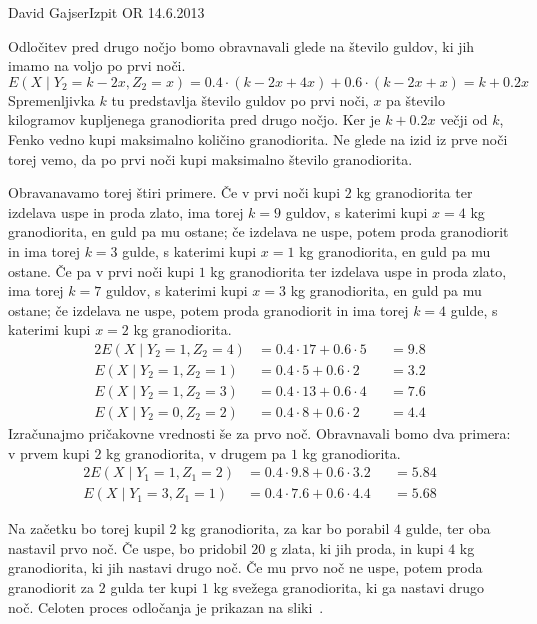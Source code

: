 \begin{naloga}{David Gajser}{Izpit OR 14.6.2013}
\begin{odgovor}
Odločitev pred drugo nočjo bomo obravnavali glede na število guldov,
ki jih imamo na voljo po prvi noči.
$$
E(X \mid  Y_2 = k-2x, Z_2 = x) = 0.4 \cdot (k - 2x + 4x) + 0.6 \cdot (k - 2x + x) = k + 0.2x
$$
Spremenljivka $k$ tu predstavlja število guldov po prvi noči,
$x$ pa število kilogramov kupljenega granodiorita pred drugo nočjo.
Ker je $k + 0.2x$ večji od $k$,
Fenko vedno kupi maksimalno količino granodiorita.
Ne glede na izid iz prve noči torej vemo,
da po prvi noči kupi maksimalno število granodiorita.

Obravanavamo torej štiri primere.
Če v prvi noči kupi $2$ kg granodiorita ter izdelava uspe in proda zlato,
ima torej $k = 9$ guldov, s katerimi kupi $x = 4$ kg granodiorita,
en guld pa mu ostane;
če izdelava ne uspe, potem proda granodiorit in ima torej $k = 3$ gulde,
s katerimi kupi $x = 1$ kg granodiorita, en guld pa mu ostane.
Če pa v prvi noči kupi $1$ kg granodiorita ter izdelava uspe in proda zlato,
ima torej $k = 7$ guldov, s katerimi kupi $x = 3$ kg granodiorita,
en guld pa mu ostane;
če izdelava ne uspe, potem proda granodiorit in ima torej $k = 4$ gulde,
s katerimi kupi $x = 2$ kg granodiorita.
\begin{alignat*}{2}
E(X \mid  Y_2 = 1, Z_2 = 4) &= 0.4 \cdot 17 + 0.6 \cdot 5 &&= 9.8 \\
E(X \mid  Y_2 = 1, Z_2 = 1) &= 0.4 \cdot 5 + 0.6 \cdot 2 &&= 3.2 \\
E(X \mid  Y_2 = 1, Z_2 = 3) &= 0.4 \cdot 13 + 0.6 \cdot 4 &&= 7.6 \\
E(X \mid  Y_2 = 0, Z_2 = 2) &= 0.4 \cdot 8 + 0.6 \cdot 2 &&= 4.4
\end{alignat*}
Izračunajmo pričakovne vrednosti še za prvo noč.
Obravnavali bomo dva primera:
v prvem kupi $2$ kg granodiorita, v drugem pa $1$ kg granodiorita.
\begin{alignat*}{2}
E(X \mid  Y_1 = 1, Z_1 = 2) &= 0.4 \cdot 9.8 + 0.6 \cdot 3.2 &&= 5.84 \\
E(X \mid  Y_1 = 3, Z_1 = 1) &= 0.4 \cdot 7.6 + 0.6 \cdot 4.4 &&= 5.68
\end{alignat*}

Na začetku bo torej kupil $2$ kg granodiorita, za kar bo porabil $4$ gulde,
ter oba nastavil prvo noč.
Če uspe, bo pridobil $20$ g zlata, ki jih proda,
in kupi $4$ kg granodiorita, ki jih nastavi drugo noč.
Če mu prvo noč ne uspe,
potem proda granodiorit za $2$ gulda ter kupi $1$ kg svežega granodiorita,
ki ga nastavi drugo noč.
Celoten proces odločanja je prikazan na sliki~\fig.

\begin{slika}
\makebox[\textwidth][c]{
\pgfslika
}
\end{slika}
\end{odgovor}
\end{naloga}
